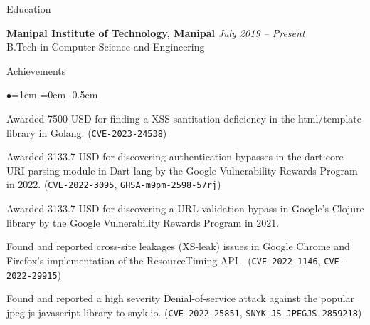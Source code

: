 \documentclass{resume} %
\date{\today}
\begin{document}
\begin{rSection}{Education}

{\bf Manipal Institute of Technology, Manipal} \hfill {\em July 2019 -- Present}  \\ B.Tech in Computer Science and Engineering\hfill
\end{rSection}
\begin{rSection}{Achievements}
\begin{list}{$\bullet$}{\leftmargin=1em \itemindent=0em}
\itemsep -0.5em
\item Awarded 7500 USD for finding a XSS santitation deficiency in the html/template library in Golang. (\texttt{CVE-2023-24538})
\item Awarded 3133.7 USD for discovering authentication bypasses in the dart:core URI parsing module in Dart-lang by the Google Vulnerability Rewards Program in 2022. (\texttt{CVE-2022-3095}, \texttt{GHSA-m9pm-2598-57rj})
\item Awarded 3133.7 USD for discovering a URL validation bypass in Google's Clojure library by the Google Vulnerability Rewards Program in 2021.
\item Found and reported cross-site leakages (XS-leak) issues in Google Chrome and Firefox's implementation of the ResourceTiming API . (\texttt{CVE-2022-1146}, \texttt{CVE-2022-29915})
\item Found and reported a high severity Denial-of-service attack against the popular jpeg-js javascript library to snyk.io. (\texttt{CVE-2022-25851}, \texttt{SNYK-JS-JPEGJS-2859218})
\end{list}
\end{rSection}
\end{document}
